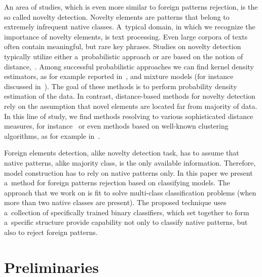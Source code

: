 \documentclass{llncs}
\begin{document}
An area of studies, which is even more similar to foreign patterns rejection, is the so called novelty detection. Novelty elements are patterns that belong to extremely infrequent native classes. A~typical domain, in which we recognize the importance of novelty elements, is text processing. Even large corpora of texts often contain meaningful, but rare key phrases. Studies on novelty detection typically utilize either a~probabilistic approach or are based on the notion of distance,~\cite{PimentelCliftonTarassenko2014}. Among successful probabilistic approaches we can find kernel density estimators, as for example reported in~\cite{Kapoor2010,KimLee2006}, and mixture models (for instance discussed in~\cite{Paalanen2006,Song2007}). The goal of these methods is to perform probability density estimation of the data. In contrast, distance-based methods for novelty detection rely on the assumption that novel elements are located far from majority of data. In this line of study, we find methods resolving to various sophisticated distance measures, for instance~\cite{Chawla2006,Ghoting2008} or even methods based on well-known clustering algorithms, as for example in~\cite{He2003,Sun2004}.

Foreign elements detection, alike novelty detection task, has to assume that native patterns, alike majority class, is the only available information. Therefore, model construction has to rely on native patterns only. In this paper we present a~method for foreign patterns rejection based on classifying models. The approach that we work on is fit to solve multi-class classification problems (when more than two native classes are present). The proposed technique uses a~collection of specifically trained binary classifiers, which set together to form a~specific structure provide capability not only to classify native patterns, but also to reject foreign patterns. 
\vspace{-3pt}

\section{Preliminaries}
  \label{sec:preliminaries}
\end{document}
